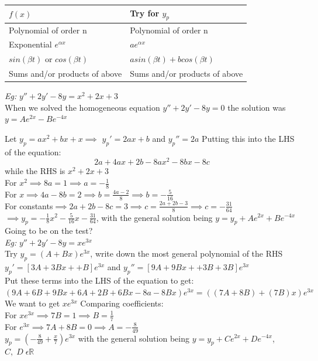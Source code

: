 \documentclass[11pt]{article}
\theoremstyle{definition}
\newcommand{\R}{\mathbb{R}}
\begin{document}
\begin{table}[h!]
\begin{tabular}{|l|l|}
\hline
\textbf{$f(x)$}                           & \textbf{Try for $y_p$}                   \\ \hline
Polynomial of order n            & Polynomial of order n           \\ \hline
Exponential $e^{\alpha x}$       & $ae^{\alpha x}$                 \\ \hline
$sin(\beta t)$ or $cos(\beta t)$ & $asin(\beta t) + bcos(\beta t)$ \\ \hline
Sums and/or products of above    & Sums and/or products of above   \\ \hline
\end{tabular}
\end{table}

\textit{Eg:} $y'' + 2y' - 8y = x^2 + 2x + 3$\\
When we solved the homogeneous equation $y'' + 2y' - 8y = 0$ the solution was $y = Ae^{2x} - Be^{-4x}$

Let $y_p = ax^2 + bx + x \implies$ $y_p' = 2ax + b$ and $y_p'' = 2a$
Putting this into the LHS of the equation:
$$2a + 4ax + 2b - 8ax^2 -8bx - 8c$$ while the RHS is $x^2 + 2x + 3$\\
For $x^2 \implies 8a = 1 \implies a = -\frac{1}{8}$\\
For $x \implies 4a - 8b = 2 \implies b = \frac{4a - 2}{8} \implies b = -\frac{5}{16}$\\
For constants$ \implies 2a + 2b - 8c = 3 \implies c = \frac{2a + 2b - 3}{8} \implies c = -\frac{31}{64}$\\
$\implies y_p = -\frac{1}{8}x^2 -\frac{5}{16}x -\frac{31}{64}$, with the general solution being $y = y_p + Ae^{2x} + Be^{-4x}$\\

Going to be on the test?\\
\textit{Eg:} $y'' + 2y' - 8y = xe^{3x}$\\
Try $y_p = (A+Bx)e^{3x}$, write down the most general polynomial of the RHS\\
$y_p' = [3A + 3Bx + + B]e^{3x}$ and $y_p'' = [9A + 9Bx + + 3B + 3B]e^{3x}$\\
Put these terms into the LHS of the equation to get:\\
$(9A + 6B + 9Bx + 6A + 2B + 6Bx -8a -8Bx)e^{3x} = ((7A + 8B) + (7B)x)e^{3x}$\\
We want to get $xe^{3x}$
Comparing coefficients:\\
For $xe^{3x} \implies 7B = 1 \implies B = \frac{1}{7}$\\
For $e^{3x} \implies 7A + 8B = 0 \implies A = -\frac{8}{49}$\\
$y_p = (-\frac{8}{49} + \frac{x}{7})e^{3x}$ with the general solution being $y = y_p + Ce^{2x} + De^{-4x}$, $C,\;D\;\epsilon \R$
\end{document}
